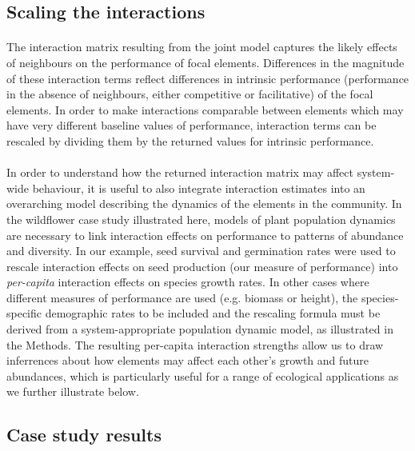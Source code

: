 \documentclass[a4,12pt]{article}
\begin{document}
    \subsection{Scaling the interactions}
    
    \paragraph{}
	The interaction matrix resulting from the joint model captures the likely effects of neighbours on the performance of focal elements. Differences in the magnitude of these interaction terms reflect differences in intrinsic performance (performance in the absence of neighbours, either competitive or facilitative) of the focal elements. In order to make interactions comparable between elements which may have very different baseline values of performance, interaction terms can be rescaled by dividing them by the returned values for intrinsic performance. 


    \paragraph{}
    In order to understand how the returned interaction matrix may affect system-wide behaviour, it is useful to also integrate interaction estimates into an overarching model describing the dynamics of the elements in the community. In the wildflower case study illustrated here, models of plant population dynamics are necessary to link interaction effects on performance to patterns of abundance and diversity. In our example, seed survival and germination rates were used to rescale interaction effects on seed production (our measure of performance) into \textit{per-capita} interaction effects on species growth rates. In other cases where different measures of performance are used (e.g. biomass or height), the species-specific demographic rates to be included and the rescaling formula must be derived from a system-appropriate population dynamic model, as illustrated in the Methods. The resulting per-capita interaction strengths allow us to draw inferrences about how elements may affect each other's growth and future abundances, which is particularly useful for a range of ecological applications as we further illustrate below. \\

    \subsection{Case study results}
\end{document}
